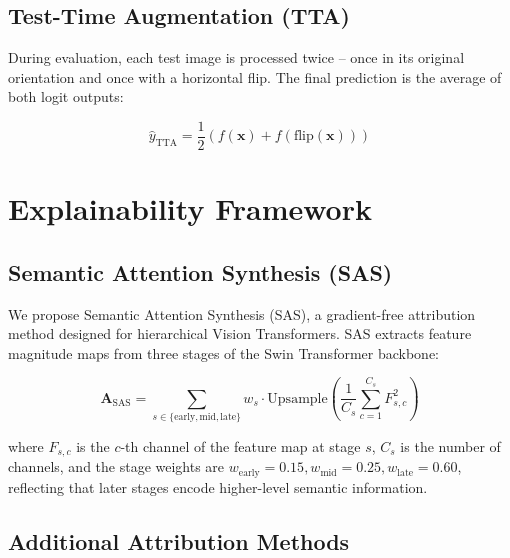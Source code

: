 \documentclass[12pt,a4paper]{report}
\begin{document}
\subsection{Test-Time Augmentation (TTA)}

During evaluation, each test image is processed twice -- once in its original orientation and once with a horizontal flip. The final prediction is the average of both logit outputs:

\begin{equation}
    \hat{y}_{\text{TTA}} = \frac{1}{2}\left( f(\mathbf{x}) + f(\text{flip}(\mathbf{x})) \right)
    \label{eq:tta}
\end{equation}

\section{Explainability Framework}

\subsection{Semantic Attention Synthesis (SAS)}

We propose Semantic Attention Synthesis (SAS), a gradient-free attribution method designed for hierarchical Vision Transformers. SAS extracts feature magnitude maps from three stages of the Swin Transformer backbone:

\begin{equation}
    \mathbf{A}_{\text{SAS}} = \sum_{s \in \{\text{early}, \text{mid}, \text{late}\}} w_s \cdot \text{Upsample}\left( \frac{1}{C_s} \sum_{c=1}^{C_s} F_{s,c}^2 \right)
    \label{eq:sas}
\end{equation}

\noindent where $F_{s,c}$ is the $c$-th channel of the feature map at stage $s$, $C_s$ is the number of channels, and the stage weights are $w_{\text{early}} = 0.15, w_{\text{mid}} = 0.25, w_{\text{late}} = 0.60$, reflecting that later stages encode higher-level semantic information.

\subsection{Additional Attribution Methods}
\end{document}
